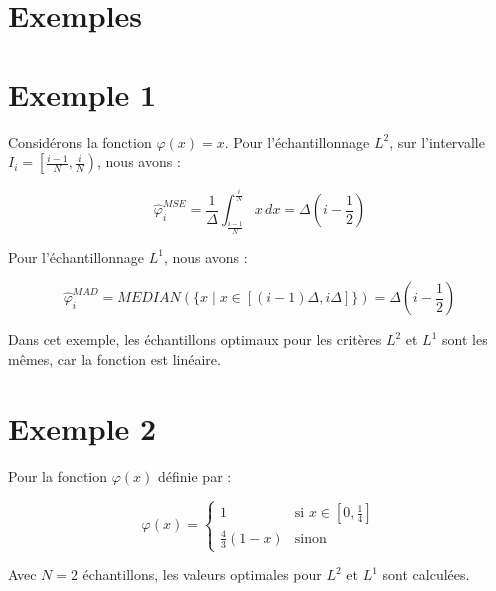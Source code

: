 \documentclass[12pt]{article}
\begin{document}
\newpage

\section{Exemples}

\sub\section{Exemple 1}

Considérons la fonction \(\varphi(x) = x\). Pour l'échantillonnage \(L^2\), sur l'intervalle \(I_i = \left[\frac{i-1}{N}, \frac{i}{N}\right)\), nous avons :

\begin{equation}
\hat{\varphi}_i^{MSE} = \frac{1}{\Delta} \int_{\frac{i-1}{N}}^{\frac{i}{N}} x \, dx = \Delta \left(i - \frac{1}{2}\right)
\end{equation}

Pour l'échantillonnage \(L^1\), nous avons :

\begin{equation}
\hat{\varphi}_i^{MAD} = MEDIAN(\{x \mid x \in [(i-1)\Delta, i\Delta]\}) = \Delta \left(i - \frac{1}{2}\right)
\end{equation}

\begin{tcolorbox}[title={Vulgarisation simple}]
Dans cet exemple, les échantillons optimaux pour les critères \(L^2\) et \(L^1\) sont les mêmes, car la fonction est linéaire.
\end{tcolorbox}


\sub\section{Exemple 2}

Pour la fonction \(\varphi(x)\) définie par :

\[
\varphi(x) = 
\begin{cases} 
1 & \text{si } x \in [0, \frac{1}{4}] \\
\frac{4}{3}(1-x) & \text{sinon}
\end{cases}
\]

Avec \(N = 2\) échantillons, les valeurs optimales pour \(L^2\) et \(L^1\) sont calculées.
\end{document}
